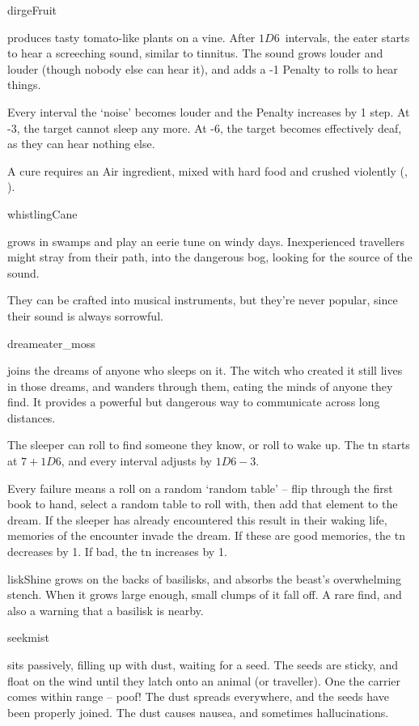 \begin{multicols}{2}
%
  {dirgeFruit}%
  {produces tasty tomato-like plants on a vine.
    After $1D6$~\glspl{interval}, the eater starts to hear a screeching sound, similar to tinnitus.
    The sound grows louder and louder (though nobody else can hear it), and adds a -1 Penalty to rolls to hear things.

    Every \gls{interval} the `noise' becomes louder and the Penalty increases by 1 step.
    At -3, the target cannot sleep any more.
    At -6, the target becomes effectively deaf, as they can hear nothing else.

    A cure requires an Air \gls{ingredient}, mixed with hard food and crushed violently (, \tn[10]).}%

%
  {whistlingCane}%
  {grows in swamps and play an eerie tune on windy days.
  Inexperienced travellers might stray from their path, into the dangerous bog, looking for the source of the sound.

  They can be crafted into musical instruments, but they're never popular, since their sound is always sorrowful.}


%
  {dreameater_moss}%
  {joins the dreams of anyone who sleeps on it.
    The \gls{witch} who created it still lives in those dreams, and wanders through them, eating the minds of anyone they find.
    It provides a powerful but dangerous way to communicate across long distances.

    The sleeper can roll  to find someone they know, or roll  to wake up.
    The \gls{tn} starts at $7 + 1D6$, and every \gls{interval} adjusts by $1D6 - 3$.

    Every failure means a roll on a random `random table' -- flip through the first book to hand, select a random table to roll with, then add that element to the dream.
    If the sleeper has already encountered this result in their waking life, memories of the encounter invade the dream.
    If these are good memories, the \gls{tn} decreases by 1.
    If bad, the \gls{tn} increases by 1.
  }

%
  {liskShine}%
  {grows on the backs of \glspl{basilisk}, and absorbs the beast's overwhelming stench.
  When it grows large enough, small clumps of it fall off.
  A rare find, and also a warning that a basilisk is nearby.
    }

%
  {seekmist}%
  {sits passively, filling up with dust, waiting for a seed.
  The seeds are sticky, and float on the wind until they latch onto an animal (or traveller).
  One the carrier comes within range -- poof!
  The dust spreads everywhere, and the seeds have been properly joined.
  The dust causes nausea, and sometimes hallucinations.

}
\end{multicols}
